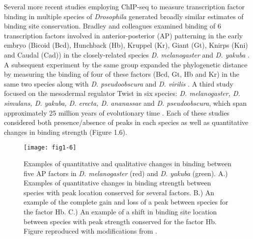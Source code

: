 Several more recent studies employing ChIP-seq to measure transcription factor binding in multiple species of \emph{Drosophila} generated broadly similar estimates of binding site conservation. Bradley and colleagues examined binding of 6 transcription factors involved in anterior-posterior (AP) patterning in the early embryo (Bicoid (Bcd), Hunchback (Hb), Kruppel (Kr), Giant (Gt), Knirps (Kni) and Caudal (Cad)) in the closely-related species \emph{D. melanogaster} and \emph{D. yakuba} \citep{bradley_binding_2010}. A subsequent experiment by the same group expanded the phylogenetic distance by measuring the binding of four of these factors (Bcd, Gt, Hb and Kr) in the same two species along with \emph{D. pseudoobscura} and \emph{D. virilis} \citep{paris_extensive_2013}. A third study focused on the mesodermal regulator Twist in six species: \emph{D. melanogaster, D. simulans, D. yakuba, D. erecta, D. ananassae} and \emph{D. pseudoobscura}, which span approximately 25 million years of evolutionary time \citep{he_high_2011}. Each of these studies considered both presence/absence of peaks in each species as well as quantitative changes in binding strength (Figure 1.6).\\ 

\begin{figure}
\centering
\texttt{[image: fig1-6]}
\caption{Examples of quantitative and qualitative changes in binding between five AP factors in \emph{D. melanogaster} (red) and \emph{D. yakuba} (green). A.) Examples of quantitative changes in binding strength between species with peak location conserved for several factors. B.) An example of the complete gain and loss of a peak between species for the factor Hb. C.) An example of a shift in binding site location between species with peak strength conserved for the factor Hb. Figure reproduced with modifications from \citet{bradley_binding_2010}.}
\label{Figure 1.6}
\end{figure}

